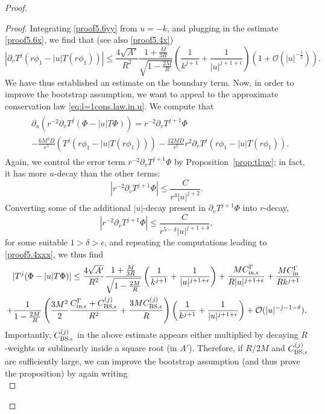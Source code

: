 \documentclass[11pt,english]{article}
\numberwithin{equation}{section}
\theoremstyle{remark}
\theoremstyle{plain}
\theoremstyle{remark}
\newcommand{\pu}{\partial_u}
\newcommand{\pv}{\partial_v}
\renewcommand{\(}{\left(}
\renewcommand{\)}{\right)}
\begin{document}
\begin{proof}
\begin{proof}
Integrating \eqref{proof5.6yy} from $u=-k$, and plugging in the estimate \eqref{proof5.6x}, we find that (see also \eqref{proof5.4x})
\begin{equation}
|\pv T^j(r\phi_1-|u|T(r\phi_1))|\leq \frac{4\sqrt{A'}}{R^2}\frac{1+\frac{M}{3R}}{\sqrt{1-\frac{2M}{R}}}\left(\frac{1}{k^{j+1}}+\frac{1}{|u|^{j+1+\epsilon}}\right)(1+\mathcal{O}(|u|^{-\frac12})).
\end{equation}
We have thus established an estimate on the boundary term. Now, in order to improve the bootstrap assumption, we want to appeal to the approximate conservation law \eqref{eq:l=1cons.law.in.u}. We compute that
\begin{align}
\begin{split}
	&\pu\left(r^{-2}\pv T^j(\Phi-|u|T\Phi)\right)
	=r^{-2}\pv T^{j+1}\Phi\\
	&-\frac{6M^2D}{r^5}(T^j(r\phi_1-|u| T(r\phi_1)))-\frac{12MD}{r^5}r^2\pv T^j(r\phi_1-|u| T(r\phi_1)).
\end{split}
\end{align}
Again, we control the error term $r^{-2}\pv T^{j+1}\Phi$ by Proposition~\ref{prop:tl:pv}; in fact, it has more $u$-decay than the other terms:
\[|r^{-2}\pv T^{j+1}\Phi|\leq 	\frac{C}{r^4|u|^{j+2}}.	\]
 Converting some of the additional $|u|$-decay present in $\pv T^{j+1}\Phi$ into $r$-decay,
 \[|r^{-2}\pv T^{j+1}\Phi|\leq 	\frac{C}{r^{5-\delta}|u|^{j+1+\delta}},	\]
 for some suitable $1>\delta>\epsilon$, and repeating the computations leading to \eqref{proof5.4xxx}, we thus find
\begin{multline}\label{proof5.6xx}
|T^j(\Phi-|u|T\Phi)|\leq \frac{4\sqrt{A'}}{R^2}\frac{1+\frac{M}{3R}}{\sqrt{1-\frac{2M}{R}}}\left(\frac{1}{k^{j+1}}+\frac{1}{|u|^{j+1+\epsilon}}\right)+\frac{MC_{\mathrm{in},\epsilon}^\Gamma}{R|u|^{j+1+\epsilon}}+ \frac{MC_{\mathrm{in}}^\Gamma}{Rk^{j+1}}\\
+\frac{1}{1-\frac{2M}{R}}\left(\frac{3M^2}{2}\frac{C_{\mathrm{in},\epsilon}^\Gamma+C_{\mathrm{BS},\epsilon}^{(j)}}{R^2}+\frac{3MC_{\mathrm{BS},\epsilon}^{(j)}}{R}\right)\left(\frac{1}{k^{j+1}}+\frac{1}{|u|^{j+1+\epsilon}}\right)
+\mathcal O(|u|^{-{j-1-\delta}}).
\end{multline}
Importantly, $C_{\mathrm{BS},\epsilon}^{(j)}$ in the above estimate appears either multiplied by decaying $R$-weights or sublinearly inside a square root (in $A'$).
Therefore, if $R/2M$ and $C_{\mathrm{BS},\epsilon}^{(j)}$ are sufficiently large, we can improve the bootstrap assumption (and thus prove the proposition) by again writing
\begin{equation}

\end{equation}
\end{proof}
\end{proof}
\end{document}
